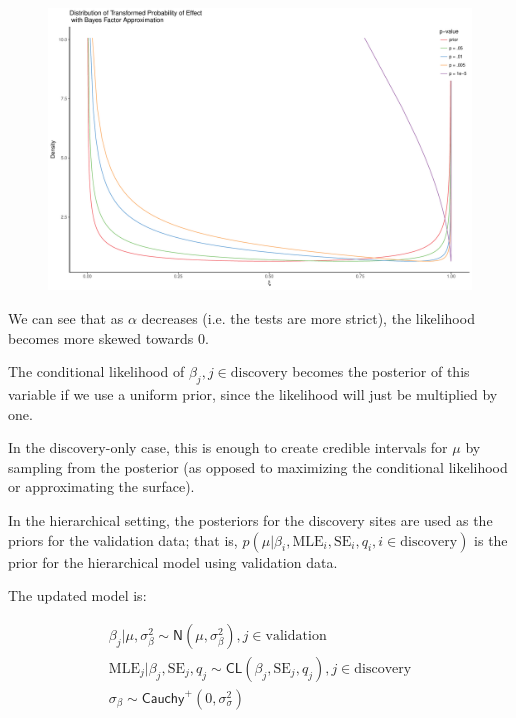 \documentclass[AMA,STIX1COL]{WileyNJD-v2}\usepackage[]{graphicx}\usepackage[]{color}
\makeatletter
\def\maxwidth{ %
  \ifdim\Gin@nat@width>\linewidth
    \linewidth
  \else
    \Gin@nat@width
  \fi
}
\newenvironment{knitrout}{}{} %
\makeatother
\begin{document}
\begin{figure}
\begin{knitrout}
\color{fgcolor}
\includegraphics[width=\maxwidth]{figure/unnamed-chunk-5-1} 

\end{knitrout}
\end{figure}
We can see that as $\alpha$ decreases (i.e. the tests are more strict), the likelihood becomes more skewed towards 0.

The conditional likelihood of $\beta_{ j}, j\in \text{discovery}$ becomes the posterior of this variable if we use a uniform prior, since the likelihood will just be multiplied by one.

In the discovery-only case, this is enough to create credible intervals for $\mu$ by sampling from the posterior (as opposed to maximizing the conditional likelihood or approximating the surface).

In the hierarchical setting, the posteriors for the discovery sites are used as the priors for the validation data; that is, $p(\mu| \beta_i, \text{MLE}_i,\text{SE}_i, q_i, i \in  \text{discovery})$ is the prior for the hierarchical model using validation data.

The updated model is:

\begin{gather} \label{eq6}
\beta_{j}|\mu, \sigma_{\beta}^{2} \sim \textsf{N}(\mu, \sigma_{\beta}^{2}) , j \in \text{validation}\\
\text{MLE}_{j}|\beta_{j},\text{SE}_{j}, q_j \sim \textsf{CL}(\beta_{j},\text{SE}_{j}, q_j) , j \in \text{discovery}\\
\sigma_{\beta}\sim \textsf{Cauchy}^+(0,\sigma^2_{\sigma})
\end{gather}
\end{document}

